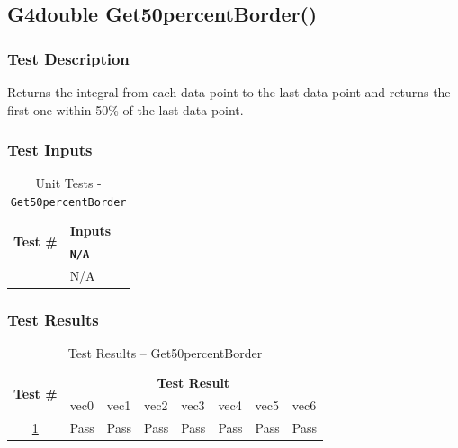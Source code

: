 \documentclass[12pt]{article}
\newcounter{TestCounter}
\begin{document}
\subsection{G4double Get50percentBorder()}%
	\subsubsection{Test Description}
	 Returns the integral from each data point to the last data point and returns the first one within 
50\% of the last data point.
	
	\subsubsection{Test Inputs}
		\begin{table}[H]
		\centering
		\caption{Unit Tests - \texttt{Get50percentBorder}}\label{Get50percentBorder_unit}
		\begin{tabular}{lll}
		\toprule
		\multirow{2}{*}{\bf Test \#}  & \multicolumn{1}{c}{\bf Inputs}\\
		& \bf \texttt{N/A}\\\midrule
		{TestCounter}\arabic{TestCounter}\label{Get50percentBorder_0} & N/A \\
		\bottomrule
		\end{tabular}
		\end{table}
	
	\subsubsection{Test Results}
		\begin{table}[H]
		\centering
		\caption{Test Results -- Get50percentBorder}\label{Get50percentBorder_acc}
		\begin{tabular}{clllllll}
		\toprule
		\multirow{2}{*}{\bf Test \#} & \multicolumn{7}{c}{\bf Test Result}\\
		& vec0 & vec1 & vec2 & vec3 & vec4 & vec5 & vec6\\\midrule
		\ref{Get50percentBorder_0} & Pass & Pass & Pass & Pass & Pass & Pass & Pass\\
		\bottomrule
		\end{tabular}
		\end{table}
\end{document}
